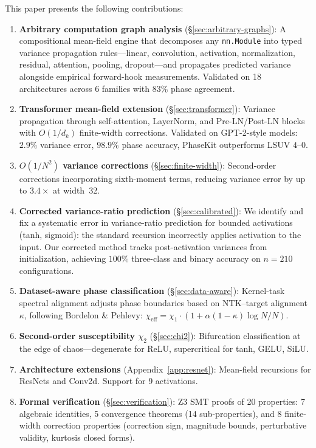 \documentclass[10pt]{article}
\begin{document}
This paper presents the following contributions:
\begin{enumerate}[nosep]
    \item \textbf{Arbitrary computation graph analysis} (\S\ref{sec:arbitrary-graphs}): A compositional mean-field engine that decomposes any \texttt{nn.Module} into typed variance propagation rules---linear, convolution, activation, normalization, residual, attention, pooling, dropout---and propagates predicted variance alongside empirical forward-hook measurements. Validated on 18 architectures across 6 families with 83\% phase agreement.
    \item \textbf{Transformer mean-field extension} (\S\ref{sec:transformer}): Variance propagation through self-attention, LayerNorm, and Pre-LN/Post-LN blocks with $O(1/d_k)$ finite-width corrections. Validated on GPT-2-style models: $2.9\%$ variance error, $98.9\%$ phase accuracy, PhaseKit outperforms LSUV $4$--$0$.
    \item \textbf{$O(1/N^2)$ variance corrections} (\S\ref{sec:finite-width}): Second-order corrections incorporating sixth-moment terms, reducing variance error by up to $3.4\times$ at width~32.
    \item \textbf{Corrected variance-ratio prediction} (\S\ref{sec:calibrated}): We identify and fix a systematic error in variance-ratio prediction for bounded activations (tanh, sigmoid): the standard recursion incorrectly applies activation to the input. Our corrected method tracks post-activation variances from initialization, achieving $100\%$ three-class and binary accuracy on $n=210$ configurations.
    \item \textbf{Dataset-aware phase classification} (\S\ref{sec:data-aware}): Kernel-task spectral alignment adjusts phase boundaries based on NTK--target alignment $\kappa$, following Bordelon \& Pehlevy: $\chi_{\mathrm{eff}} = \chi_1 \cdot (1 + \alpha(1-\kappa)\log N/N)$.
    \item \textbf{Second-order susceptibility $\chi_2$} (\S\ref{sec:chi2}): Bifurcation classification at the edge of chaos---degenerate for ReLU, supercritical for tanh, GELU, SiLU.
    \item \textbf{Architecture extensions} (Appendix~\ref{app:resnet}): Mean-field recursions for ResNets and Conv2d. Support for 9 activations.
    \item \textbf{Formal verification} (\S\ref{sec:verification}): Z3 SMT proofs of 20 properties: 7 algebraic identities, 5 convergence theorems (14 sub-properties), and 8 finite-width correction properties (correction sign, magnitude bounds, perturbative validity, kurtosis closed forms).
\end{enumerate}
\end{document}
